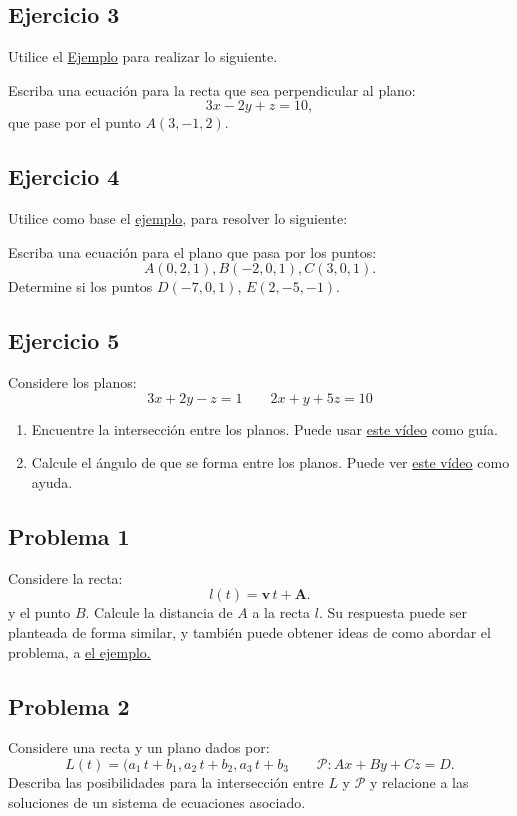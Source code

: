 \documentclass[11pt]{article}
\begin{document}
\subsection{Ejercicio 3}
\label{sec:orgb51d3f0}
Utilice el \href{https://vimeo.com/574241043}{Ejemplo} para realizar lo siguiente.

Escriba una ecuación para la recta que sea perpendicular al plano:
\[
3x - 2y + z = 10,
\]
que pase por el punto \(A(3, -1, 2)\).

\subsection{Ejercicio 4}
\label{sec:orgd8e0665}

Utilice como base el \href{https://vimeo.com/574241111}{ejemplo}, para resolver lo siguiente:

Escriba una ecuación para el plano que pasa por los puntos:
  \[
    A(0, 2, 1), B(-2, 0, 1), C(3, 0, 1).
  \]
Determine si los puntos \(D(-7, 0, 1)\), \(E(2, -5, -1)\).

\subsection{Ejercicio 5}
\label{sec:org95c0763}

Considere los planos:
\[ 
3x + 2y - z = 1
\qquad
2x + y + 5z = 10
\]
\begin{enumerate}
\item Encuentre la intersección entre los planos. Puede usar \href{https://vimeo.com/574241177}{este vídeo} como guía.
\item Calcule el ángulo de que se forma entre los planos. Puede ver \href{https://vimeo.com/574241229}{este vídeo} como ayuda.
\end{enumerate}

\subsection{Problema 1}
\label{sec:orgfcd0bb3}
Considere la recta:
  \[
    l(t) = \mathbf{v} \, t + \mathbf{A}.
  \]
  y el punto \(B\). Calcule la distancia de \(A\) a la recta \(l\). Su respuesta puede ser planteada de forma similar, y también puede obtener ideas de como abordar el problema, a \href{https://vimeo.com/574241301}{el ejemplo.}


\subsection{Problema 2}
\label{sec:org3edd2bf}

Considere una recta y un plano dados por:
  \[
    L(t) = (a_1 \, t + b_1, a_2 \, t + b_2, a_3 \, t + b_3
    \qquad
    \mathcal{P}: Ax + By + Cz = D.
  \]
  Describa las posibilidades para la intersección entre \(L\) y \(\mathcal{P}\) y relacione a las soluciones de un sistema de ecuaciones asociado.
\end{document}

